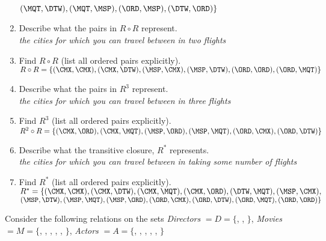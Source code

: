 \begin{questions}
\begin{EnvFullwidth}
\begin{solution}
\begin{enumerate}[label=(\alph*)]
    	\hspace*{0.4in} $(\MQT, \DTW), (\MQT, \MSP), (\ORD, \MSP), (\DTW, \ORD) \}$
    	\item Describe what the pairs in $R \circ R$ represent. \\
    	\textit{the cities for which you can travel between in two flights}
    	\item Find $R \circ R$ (list all ordered pairs explicitly). \\
    	$R \circ R = \{ (\CMX, \CMX), (\CMX, \DTW), (\MSP, \CMX), (\MSP, \DTW), (\ORD, \ORD), (\ORD, \MQT) \}$
    	\item Describe what the pairs in $R^3$ represent. \\
    	\textit{the cities for which you can travel between in three flights}
    	\item Find $R^3$ (list all ordered pairs explicitly). \\
    	$R^2 \circ R = \{ (\CMX, \ORD), (\CMX, \MQT), (\MSP, \ORD), (\MSP, \MQT), (\ORD, \CMX), (\ORD, \DTW) \}$ 
    	\item Describe what the transitive closure, $R^{*}$ represents.  \\
    	\textit{the cities for which you can travel between in taking some number of flights}
    	\item Find $R^{*}$ (list all ordered pairs explicitly). \\
    	$R^* = \{ (\CMX, \CMX),  (\CMX, \DTW),  (\CMX, \MQT),  (\CMX, \ORD),  (\DTW, \MQT),  (\MSP, \CMX), $ \\
    	$  (\MSP, \DTW),  (\MSP, \MQT),  (\MSP, \ORD),  (\ORD, \CMX),  (\ORD, \DTW),  (\ORD, \MQT),  (\ORD, \ORD) \} $
    \end{enumerate}
    \end{solution}
    \end{EnvFullwidth}



 Consider the following relations on the sets \textit{Directors} $ = D = \{$, ,  $\}$, \textit{Movies} $ = M = \{$, , , , ,   $\}$, \textit{Actors} $= A = \{$, , , , ,  $\}$


\end{questions}
